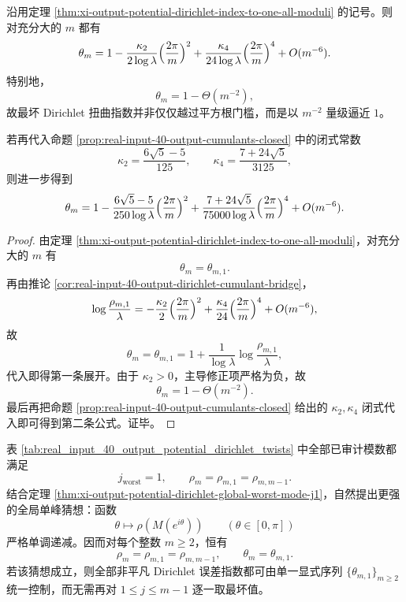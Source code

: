 \begin{corollary}\label{cor:xi-output-potential-dirichlet-index-expansion-all-moduli}
沿用定理 \ref{thm:xi-output-potential-dirichlet-index-to-one-all-moduli} 的记号。则对充分大的 \(m\) 都有
\[
\theta_m
=
1-\frac{\kappa_2}{2\log\lambda}\Bigl(\frac{2\pi}{m}\Bigr)^2
+\frac{\kappa_4}{24\log\lambda}\Bigl(\frac{2\pi}{m}\Bigr)^4
+O(m^{-6}).
\]
特别地，
\[
\theta_m=1-\Theta(m^{-2}),
\]
故最坏 Dirichlet 扭曲指数并非仅仅越过平方根门槛，而是以 \(m^{-2}\) 量级逼近 \(1\)。

若再代入命题 \ref{prop:real-input-40-output-cumulants-closed} 中的闭式常数
\[
\kappa_2=\frac{6\sqrt5-5}{125},
\qquad
\kappa_4=\frac{7+24\sqrt5}{3125},
\]
则进一步得到
\[
\theta_m
=
1-\frac{6\sqrt5-5}{250\log\lambda}\Bigl(\frac{2\pi}{m}\Bigr)^2
+\frac{7+24\sqrt5}{75000\log\lambda}\Bigl(\frac{2\pi}{m}\Bigr)^4
+O(m^{-6}).
\]
\end{corollary}
\begin{proof}
由定理 \ref{thm:xi-output-potential-dirichlet-index-to-one-all-moduli}，对充分大的 \(m\) 有
\[
\theta_m=\theta_{m,1}.
\]
再由推论 \ref{cor:real-input-40-output-dirichlet-cumulant-bridge}，
\[
\log\frac{\rho_{m,1}}{\lambda}
=
-\frac{\kappa_2}{2}\Bigl(\frac{2\pi}{m}\Bigr)^2
+\frac{\kappa_4}{24}\Bigl(\frac{2\pi}{m}\Bigr)^4
+O(m^{-6}),
\]
故
\[
\theta_m
=
\theta_{m,1}
=
1+\frac{1}{\log\lambda}\log\frac{\rho_{m,1}}{\lambda},
\]
代入即得第一条展开。由于 \(\kappa_2>0\)，主导修正项严格为负，故
\[
\theta_m=1-\Theta(m^{-2}).
\]
最后再把命题 \ref{prop:real-input-40-output-cumulants-closed} 给出的 \(\kappa_2,\kappa_4\) 闭式代入即可得到第二条公式。证毕。
\end{proof}

\begin{conjecture}\label{conj:xi-output-potential-dirichlet-all-m-j1}
表 \ref{tab:real_input_40_output_potential_dirichlet_twists} 中全部已审计模数都满足
\[
j_{\mathrm{worst}}=1,
\qquad
\rho_m=\rho_{m,1}=\rho_{m,m-1}.
\]
结合定理 \ref{thm:xi-output-potential-dirichlet-global-worst-mode-j1}，自然提出更强的全局单峰猜想：函数
\[
\theta\longmapsto \rho(M(e^{i\theta}))
\qquad (\theta\in[0,\pi])
\]
严格单调递减。因而对每个整数 \(m\ge 2\)，恒有
\[
\rho_m=\rho_{m,1}=\rho_{m,m-1},
\qquad
\theta_m=\theta_{m,1}.
\]
若该猜想成立，则全部非平凡 Dirichlet 误差指数都可由单一显式序列 \(\{\theta_{m,1}\}_{m\ge 2}\) 统一控制，而无需再对 \(1\le j\le m-1\) 逐一取最坏值。
\end{conjecture}
